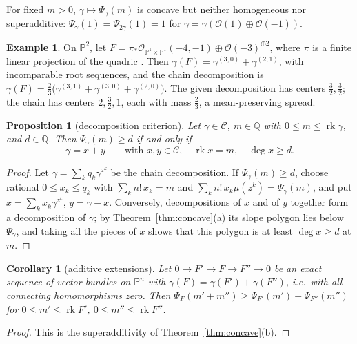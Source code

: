 \documentclass[11pt]{amsart}
\newtheorem{proposition}[theorem]{Proposition}
\newtheorem{corollary}[theorem]{Corollary}
\theoremstyle{definition}
\newtheorem{example}[theorem]{Example}
\theoremstyle{remark}
\newcommand{\PP}{\mathbb{P}}
\newcommand{\QQ}{\mathbb{Q}}
\newcommand{\OO}{\mathcal{O}}
\newcommand{\CC}{\mathcal{C}}
\DeclareMathOperator{\rk}{rk}
\begin{document}
For fixed $m>0$, $\gamma\mapsto\Psi_\gamma(m)$ is concave but neither homogeneous nor superadditive: $\Psi_\gamma(1)=\Psi_{2\gamma}(1)=1$ for $\gamma=\gamma(\OO(1)\oplus\OO(-1))$.

\begin{example}\label{ex:sum}
On $\PP^2$, let $F=\pi_*\OO_{\PP^1\times\PP^1}(-4,-1)\oplus\OO(-3)^{\oplus2}$, where $\pi$ is a finite linear projection of the quadric \cite[Thm.~6.1]{ES09}. Then $\gamma(F)=\gamma^{(3,0)}+\gamma^{(2,1)}$, with incomparable root sequences, and the chain decomposition is $\gamma(F)=\frac23\big(\gamma^{(3,1)}+\gamma^{(3,0)}+\gamma^{(2,0)}\big)$. The given decomposition has centers $\frac32,\frac32$; the chain has centers $2,\frac32,1$, each with mass $\frac23$, a mean-preserving spread.
\end{example}

\begin{proposition}[decomposition criterion]\label{prop:splitting}
Let $\gamma\in\CC$, $m\in\QQ$ with $0\le m\le\rk\gamma$, and $d\in\QQ$. Then $\Psi_\gamma(m)\ge d$ if and only if
\[
\gamma=x+y\qquad\text{with }x,y\in\CC,\quad \rk x=m,\quad \deg x\ge d .
\]
\end{proposition}

\begin{proof}
Let $\gamma=\sum_kq_k\gamma^{z^k}$ be the chain decomposition. If $\Psi_\gamma(m)\ge d$, choose rational $0\le x_k\le q_k$ with $\sum_kn!\,x_k=m$ and $\sum_kn!\,x_k\mu(z^k)=\Psi_\gamma(m)$, and put $x=\sum_kx_k\gamma^{z^k}$, $y=\gamma-x$. Conversely, decompositions of $x$ and of $y$ together form a decomposition of $\gamma$; by Theorem~\ref{thm:concave}(a) its slope polygon lies below $\Psi_\gamma$, and taking all the pieces of $x$ shows that this polygon is at least $\deg x\ge d$ at $m$.
\end{proof}

\begin{corollary}[additive extensions]\label{cor:additive}
Let $0\to F'\to F\to F''\to0$ be an exact sequence of vector bundles on $\PP^n$ with $\gamma(F)=\gamma(F')+\gamma(F'')$, i.e.\ with all connecting homomorphisms zero. Then $\Psi_F(m'+m'')\ge\Psi_{F'}(m')+\Psi_{F''}(m'')$ for $0\le m'\le\rk F'$, $0\le m''\le\rk F''$.
\end{corollary}

\begin{proof}
This is the superadditivity of Theorem~\ref{thm:concave}(b).
\end{proof}
\end{document}
